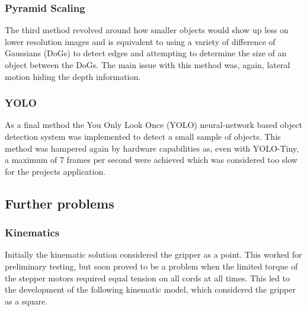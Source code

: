 \documentclass[conference]{IEEEtran}
\begin{document}
\subsubsection{Pyramid Scaling}
The third method revolved around how smaller objects would show up less on lower resolution images and is equivalent to using a variety of difference of Gaussians (DoGs) to detect edges and attempting to determine the size of an object between the DoGs. The main issue with this method was, again, lateral motion hiding the depth information.

\subsubsection{YOLO}
As a final method the You Only Look Once (YOLO) neural-network based object detection system was implemented to detect a small sample of objects. This method was hampered again by hardware capabilities as, even with YOLO-Tiny, a maximum of 7 frames per second were achieved which was considered too slow for the projects application.\subsection{Further problems}\subsubsection{Kinematics}\label{kinematic_solution_3}
Initially the kinematic solution considered the gripper as a point. This worked for preliminary testing, but soon proved to be a problem when the limited torque of the stepper motors required equal tension on all cords at all times. This led to the development of the following kinematic model, which considered the gripper as a square. 
\end{document}
